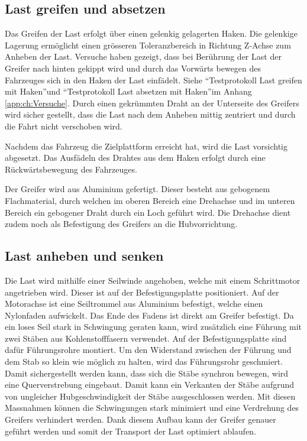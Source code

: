 \documentclass[a4paper]{report}
\begin{document}
\newpage

\subsection{Last greifen und absetzen}

Das Greifen der Last erfolgt über einen gelenkig gelagerten Haken. Die gelenkige Lagerung ermöglicht einen grösseren Toleranzbereich in Richtung Z-Achse zum Anheben der Last. Versuche haben gezeigt, dass bei Berührung der Last der Greifer nach hinten gekippt wird und durch das Vorwärts bewegen des Fahrzeuges sich in den Haken der Last einfädelt. Siehe \textquotedblleft Testprotokoll Last greifen mit Haken\textquotedblright und \textquotedblleft Testprotokoll Last absetzen mit Haken\textquotedblright  im Anhang \ref{app:ch:Versuche}. Durch einen gekrümmten Draht an der Unterseite des Greifers wird sicher gestellt, dass die Last nach dem Anheben mittig zentriert und durch die Fahrt nicht verschoben wird.

Nachdem das Fahrzeug die Zielplattform erreicht hat, wird die Last vorsichtig abgesetzt. Das Ausfädeln des Drahtes aus dem Haken erfolgt durch eine Rückwärts\-bewegung des Fahrzeuges.

Der Greifer wird aus Aluminium gefertigt. Dieser besteht aus gebogenem Flachmaterial, durch welchen im oberen Bereich eine Drehachse und im unteren Bereich ein gebogener Draht durch ein Loch geführt wird. Die Drehachse dient zudem noch als Befestigung des Greifers an die Hubvorrichtung.

\subsection{Last anheben und senken}
Die Last wird mithilfe einer Seilwinde angehoben, welche mit einem Schrittmotor angetrieben wird. Dieser ist auf der Befestigungsplatte positioniert. Auf der Motorachse ist eine Seiltrommel aus Aluminium befestigt, welche einen Nylonfaden aufwickelt. Das Ende des Fadens ist direkt am Greifer befestigt. Da ein loses Seil stark in Schwingung geraten kann, wird zusätzlich eine Führung mit zwei Stäben aus Kohlenstofffasern verwendet. Auf der Befestigungsplatte sind dafür Führungsrohre montiert. Um den Widerstand zwischen der Führung und dem Stab so klein wie möglich zu halten, wird das Führungsrohr geschmiert. Damit sichergestellt werden kann, dass sich die Stäbe synchron bewegen, wird eine Querverstrebung eingebaut. Damit kann ein Verkanten der Stäbe aufgrund von ungleicher Hubgeschwindigkeit der Stäbe ausgeschlossen werden. Mit diesen Massnahmen können die Schwingungen stark minimiert und eine Verdrehung des Greifers verhindert werden. Dank diesem Aufbau kann der Greifer genauer geführt werden und somit der Transport der Last optimiert ablaufen.
\end{document}
